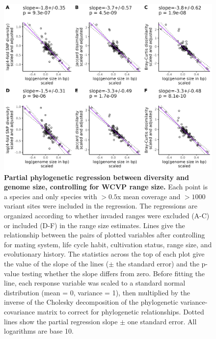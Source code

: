 \documentclass[12pt]{article}
\begin{document}
\begin{figure}[H]
    \centering
    \includegraphics[width=\textwidth]{figures/appendix_d/wcvp_area_vs_genome_size_corrected_2024-12-12.jpg}
    \caption{\textbf{Partial phylogenetic regression between diversity and genome size, controlling for WCVP range size.} Each point is a species and only species with $>0.5$x mean coverage and $>1000$ variant sites were included in the regression. The regressions are organized according to whether invaded ranges were excluded (A-C) or included (D-F) in the range size estimates. Lines give the relationship between the pairs of plotted variables after controlling for mating system, life cycle habit, cultivation status, range size, and evolutionary history. The statistics across the top of each plot give the value of the slope of the lines ($\pm$ the standard error) and the p-value testing whether the slope differs from zero. Before fitting the line, each response variable was scaled to a standard normal distribution (mean = 0, variance = 1), then multiplied by the inverse of the Cholesky decomposition of the phylogenetic variance-covariance matrix to correct for phylogenetic relationships. Dotted lines show the partial regression slope $\pm$ one standard error. All logarithms are base 10.}
\end{figure}
\end{document}
